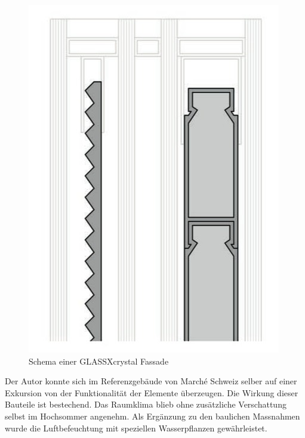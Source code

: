 \documentclass[11pt,a4paper]{scrartcl}
\begin{document}
\begin{figure}[h!]
\begin{center}
\includegraphics[scale=0.7]{images/glassxcrystal.jpg}
\caption{Schema einer GLASSX\circledR crystal Fassade \cite{glassxbr}}
\label{fig:glassx schema}
\end{center}
\end{figure}

Der Autor konnte sich im Referenzgebäude von Marché Schweiz selber auf einer
Exkursion von der Funktionalität der Elemente überzeugen. Die Wirkung dieser
Bauteile ist bestechend. Das Raumklima blieb ohne zusätzliche Verschattung
selbst im Hochsommer angenehm. Als Ergänzung zu den baulichen Massnahmen wurde
die Luftbefeuchtung mit speziellen Wasserpflanzen gewährleistet. 
\newpage
\end{document}
